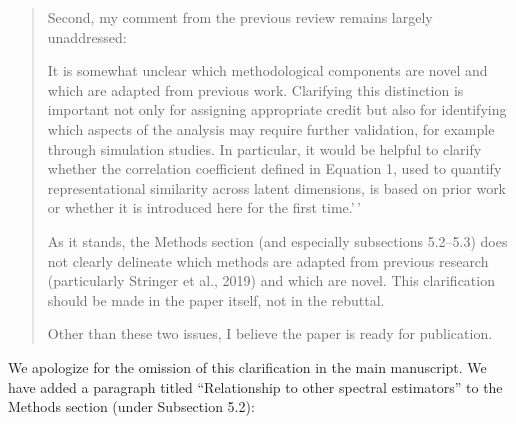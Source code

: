 \documentclass[10pt]{article}
\begin{document}
\begin{quote}
Second, my comment from the previous review remains largely unaddressed:

It is somewhat unclear which methodological components are novel and which are adapted from previous work. Clarifying this distinction is important not only for assigning appropriate credit but also for identifying which aspects of the analysis may require further validation, for example through simulation studies. In particular, it would be helpful to clarify whether the correlation coefficient defined in Equation 1, used to quantify representational similarity across latent dimensions, is based on prior work or whether it is introduced here for the first time.'\,'

As it stands, the Methods section (and especially subsections 5.2--5.3) does not clearly delineate which methods are adapted from previous research (particularly Stringer et al., 2019) and which are novel. This clarification should be made in the paper itself, not in the rebuttal.

Other than these two issues, I believe the paper is ready for publication.
\end{quote}

We apologize for the omission of this clarification in the main manuscript. We have added a paragraph titled ``Relationship to other spectral estimators'' to the Methods section (under Subsection 5.2):
\end{document}
